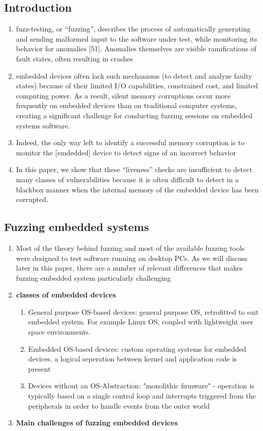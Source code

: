 \documentclass{article}
\begin{document}
\subsection{Introduction}
\begin{enumerate}
\item fuzz-testing, or “fuzzing”, describes the process of automatically generating and sending malformed input to the software under test, while monitoring its behavior for
anomalies [51]. Anomalies themselves are visible ramifications of fault states, often resulting in crashes
\item embedded devices often lack such mechanisms (to detect and analyze faulty states) because of their limited I/O capabilities, constrained cost, and limited computing power.
As a result, silent memory corruptions occur more frequently on embedded devices than on traditional computer systems, creating a significant challenge for conducting fuzzing sessions
on embedded systems software.
\item Indeed, the only way left to identify a successful memory corruption is to monitor the [emdedded] device to detect signs of an incorrect behavior
\item In this paper, we show that these “liveness” checks are insufficient to detect many classes of vulnerabilities because it is often difficult to detect in a blackbox manner when 
the internal memory of the embedded device has been corrupted.
\end{enumerate}

\subsection{Fuzzing embedded systems}
\begin{enumerate}
\item Most of the theory behind fuzzing and most of the available fuzzing tools were designed to test software running on
desktop PCs. As we will discuss later in this paper, there are a number of relevant differences that makes fuzzing embedded system particularly challenging
\item \textbf{classes of embedded devices}
	\begin{enumerate}
	\item General purpose OS-based devices: general purpose OS, retrofitted to suit embedded system. For example Linux OS, coupled with lightweight user space environments. 
	\item Embedded OS-based devices: custom operating systems for embedded devices. a logical seperation between kernel and application code is present
	\item Devices without an OS-Abstraction: "monolithic firmware" - operation is typically based on a single control loop and interrupts triggered from the peripherals in order to handle events from the outer world
	\end{enumerate}
\item \textbf{Main challenges of fuzzing embedded devices}
\end{enumerate}
\end{document}
